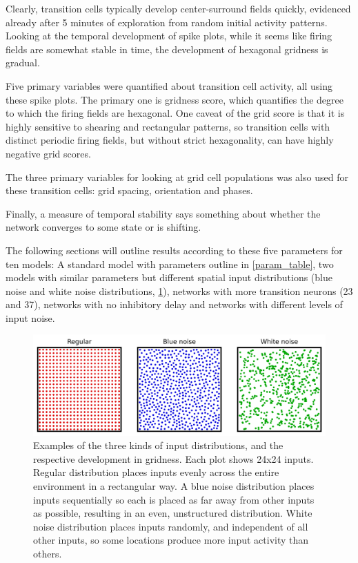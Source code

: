 \documentclass{article}
\begin{document}
    Clearly, transition cells typically develop center-surround fields quickly, evidenced already after 5 minutes of exploration from random initial activity patterns. Looking at the temporal development of spike plots, while it seems like firing fields are somewhat stable in time, the development of hexagonal gridness is gradual.

    Five primary variables were quantified about transition cell activity, all using these spike plots. The primary one is gridness score, which quantifies the degree to which the firing fields are hexagonal. One caveat of the grid score is that it is highly sensitive to shearing and rectangular patterns, so transition cells with distinct periodic firing fields, but without strict hexagonality, can have highly negative grid scores.
    
    The three primary variables for looking at grid cell populations was also used for these transition cells: grid spacing, orientation and phases. 
    
    Finally, a measure of temporal stability says something about whether the network converges to some state or is shifting. 
    
    The following sections will outline results according to these five parameters for ten models: A standard model with parameters outline in \ref{param_table}, two models with similar parameters but different spatial input distributions (blue noise and white noise distributions, \ref{input_distribution}), networks with more transition neurons (23 and 37), networks with no inhibitory delay and networks with different levels of input noise. 

    \begin{figure}
        \centering
        \begin{minipage}[t]{1\textwidth}
            \includegraphics[width=\textwidth]{distribution_plot.png}
        \end{minipage}
        \caption{Examples of the three kinds of input distributions, and the respective development in gridness. Each plot shows 24x24 inputs. Regular distribution places inputs evenly across the entire environment in a rectangular way. A blue noise distribution places inputs sequentially so each is placed as far away from other inputs as possible, resulting in an even, unstructured distribution. White noise distribution places inputs randomly, and independent of all other inputs, so some locations produce more input activity than others.}
        \label{input_distribution}
    \end{figure}
    
\end{document}
